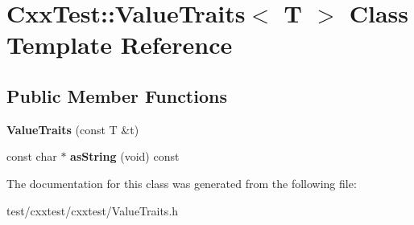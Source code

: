 \hypertarget{classCxxTest_1_1ValueTraits}{\section{Cxx\-Test\-:\-:Value\-Traits$<$ T $>$ Class Template Reference}
\label{classCxxTest_1_1ValueTraits}
}
\subsection*{Public Member Functions}
\begin{DoxyCompactItemize}
\item 
\hypertarget{classCxxTest_1_1ValueTraits_acf53c877a17c0725565e33a9580c3229}{{\bfseries Value\-Traits} (const T \&t)}\label{classCxxTest_1_1ValueTraits_acf53c877a17c0725565e33a9580c3229}

\item 
\hypertarget{classCxxTest_1_1ValueTraits_abf431a4200fb70a54019bd07a2d3e258}{const char $\ast$ {\bfseries as\-String} (void) const }\label{classCxxTest_1_1ValueTraits_abf431a4200fb70a54019bd07a2d3e258}

\end{DoxyCompactItemize}


The documentation for this class was generated from the following file\-:\begin{DoxyCompactItemize}
\item 
test/cxxtest/cxxtest/Value\-Traits.\-h\end{DoxyCompactItemize}

